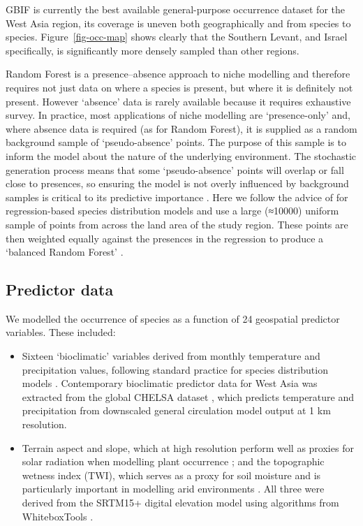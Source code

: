 \documentclass[
  authoryear,
  preprint]{elsarticle}
\providecommand{\tightlist}{%
  \setlength{\itemsep}{0pt}\setlength{\parskip}{0pt}}\usepackage{longtable,booktabs,array}
\begin{document}
GBIF is currently the best available general-purpose occurrence dataset
for the West Asia region, its coverage is uneven both geographically and
from species to species. Figure~\ref{fig-occ-map} shows clearly that the
Southern Levant, and Israel specifically, is significantly more densely
sampled than other regions.

Random Forest is a presence--absence approach to niche modelling and
therefore requires not just data on where a species is present, but
where it is definitely not present. However `absence' data is rarely
available because it requires exhaustive survey. In practice, most
applications of niche modelling are `presence-only' and, where absence
data is required (as for Random Forest), it is supplied as a random
background sample of `pseudo-absence' points. The purpose of this sample
is to inform the model about the nature of the underlying environment.
The stochastic generation process means that some `pseudo-absence'
points will overlap or fall close to presences, so ensuring the model is
not overly influenced by background samples is critical to its
predictive importance \citep{ValaviEtAl2022}. Here we follow the advice
of \citet{BarbetMassinEtAl2012} for regression-based species
distribution models and use a large (≈10000) uniform sample of points
from across the land area of the study region. These points are then
weighted equally against the presences in the regression to produce a
`balanced Random Forest' \citep{ValaviEtAl2022}.

\subsection{Predictor data}\label{sec-predictors}

We modelled the occurrence of species as a function of 24 geospatial
predictor variables. These included:

\begin{itemize}
\tightlist
\item
  Sixteen `bioclimatic' variables derived from monthly temperature and
  precipitation values, following standard practice for species
  distribution models \citep{HijmansEtAl2005}. Contemporary bioclimatic
  predictor data for West Asia was extracted from the global CHELSA
  dataset \citep{KargerEtAl2017}, which predicts temperature and
  precipitation from downscaled general circulation model output at 1 km
  resolution.
\end{itemize}

\begin{itemize}
\tightlist
\item
  Terrain aspect and slope, which at high resolution perform well as
  proxies for solar radiation when modelling plant occurrence
  \citep{AustinVanNiel2011, LeempoelEtAl2015}; and the topographic
  wetness index (TWI), which serves as a proxy for soil moisture and is
  particularly important in modelling arid environments
  \citep{KopeckyCizkova2010, CamposEtAl2016, DiVirgilioEtAl2018}. All
  three were derived from the SRTM15+ digital elevation model using
  algorithms from WhiteboxTools \citep{Lindsay2016}.
\end{itemize}
\end{document}
